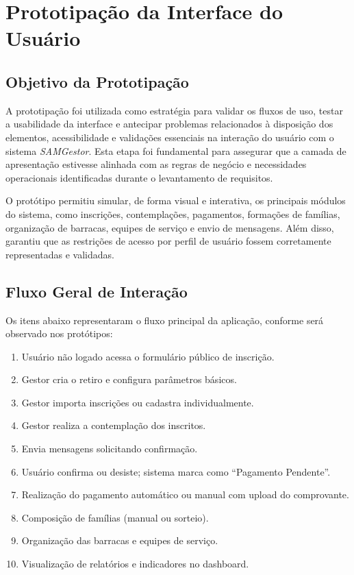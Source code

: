 

\section{Prototipação da Interface do Usuário}

\subsection{Objetivo da Prototipação}

A prototipação foi utilizada como estratégia para validar os fluxos de uso, testar a usabilidade da interface e antecipar problemas relacionados à disposição dos elementos, acessibilidade e validações essenciais na interação do usuário com o sistema \textit{SAMGestor}. Esta etapa foi fundamental para assegurar que a camada de apresentação estivesse alinhada com as regras de negócio e necessidades operacionais identificadas durante o levantamento de requisitos.

O protótipo permitiu simular, de forma visual e interativa, os principais módulos do sistema, como inscrições, contemplações, pagamentos, formações de famílias, organização de barracas, equipes de serviço e envio de mensagens. Além disso, garantiu que as restrições de acesso por perfil de usuário fossem corretamente representadas e validadas.

\subsection{Fluxo Geral de Interação}

Os itens abaixo representaram o fluxo principal da aplicação, conforme será observado nos protótipos:

\begin{enumerate}
    \item Usuário não logado acessa o formulário público de inscrição.
    \item Gestor cria o retiro e configura parâmetros básicos.
    \item Gestor importa inscrições ou cadastra individualmente.
    \item Gestor realiza a contemplação dos inscritos.
    \item Envia mensagens solicitando confirmação.
    \item Usuário confirma ou desiste; sistema marca como “Pagamento Pendente”.
    \item Realização do pagamento automático ou manual com upload do comprovante.
    \item Composição de famílias (manual ou sorteio).
    \item Organização das barracas e equipes de serviço.
    \item Visualização de relatórios e indicadores no dashboard.
\end{enumerate}

